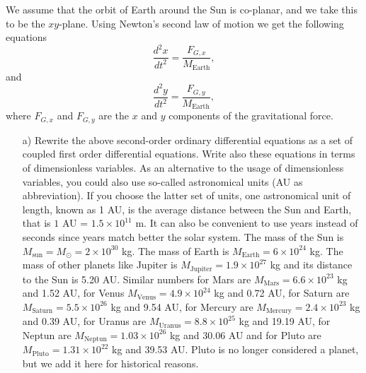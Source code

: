\documentclass[a4wide,12pt]{article}
\begin{document}
We assume that the orbit of Earth around the Sun 
is co-planar, and we take this to be the $xy$-plane.
Using Newton's second law of motion we get the following equations
\[
\frac{d^2x}{dt^2}=\frac{F_{G,x}}{M_{\mathrm{Earth}}},
\]
and 
\[
\frac{d^2y}{dt^2}=\frac{F_{G,y}}{M_{\mathrm{Earth}}},
\]
where $F_{G,x}$ and $F_{G,y}$ are the $x$ and $y$ components of the gravitational force. 
\begin{enumerate}
\item[a)]  Rewrite the above second-order ordinary differential equations as a set of coupled first order
differential equations. Write also these equations in terms of dimensionless variables.
As an alternative to the usage of dimensionless variables, you could also
use so-called  astronomical units (AU as abbreviation). If you choose the latter set of units, 
one astronomical unit of length, known as 1 AU, is the average distance between the Sun and Earth, that is
$1$ AU = $1.5\times 10^{11}$ m.  It can also be convenient to use years instead of seconds since years match
better the solar system. The mass of the Sun is $M_{\mathrm{sun}}=M_{\odot}=2\times 10^{30}$ kg. The mass of Earth is
$M_{\mathrm{Earth}}=6\times 10^{24}$ kg. The mass of other planets like Jupiter is 
$M_{\mathrm{Jupiter}}=1.9\times 10^{27}$ kg and its distance to the Sun is 5.20 AU. Similar numbers for Mars
are $M_{\mathrm{Mars}}=6.6\times 10^{23}$ kg and  1.52 AU, for Venus $M_{\mathrm{Venus}}=4.9\times 10^{24}$ kg and  0.72 AU, for Saturn are $M_{\mathrm{Saturn}}=5.5\times 10^{26}$ kg and  9.54 AU, for Mercury are $M_{\mathrm{Mercury}}=2.4\times 10^{23}$ kg and  0.39 AU, for Uranus are $M_{\mathrm{Uranus}}=8.8\times 10^{25}$ kg and  19.19 AU, for Neptun are $M_{\mathrm{Neptun}}=1.03\times 10^{26}$ kg and  30.06 AU and for Pluto are $M_{\mathrm{Pluto}}=1.31\times 10^{22}$ kg and  39.53 AU. Pluto is no longer considered  a planet, but we add it here for historical reasons.


\end{enumerate}
\end{document}
